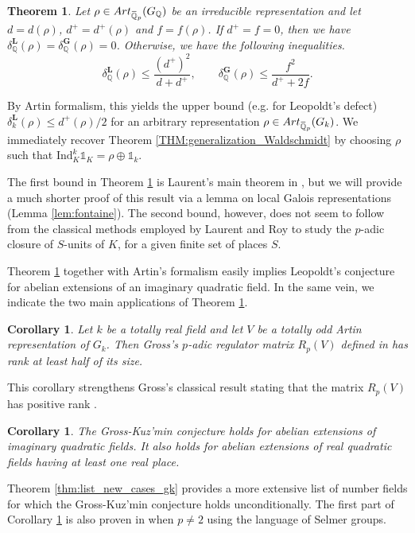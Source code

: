 \documentclass[12pt]{amsart}
\newcommand{\Q}{\mathbb{Q}}
\newcommand{\ob}[1]{\mkern 1.5mu\overline{\mkern-1.5mu#1\mkern-1.5mu}\mkern 1.5mu}
\newcommand{\Ind}{\mathrm{Ind}}
\newcommand{\Art}{\textrm{Art}}
\theoremstyle{defstyle}
\theoremstyle{thmstyle}
\newtheorem{THM}[subsection]{Theorem}
\newtheorem{CORO}[subsection]{Corollary}
\begin{document}
	\begin{THM}\label{THM:main_thm}
		Let $\rho \in \Art_{\ob{\Q}_p}(G_\Q)$ be an irreducible representation and let $d=d(\rho)$, $d^+=d^+(\rho)$ and $f=f(\rho)$. If $d^+=f=0$, then we have $\delta^\textbf{L}_\Q(\rho)=\delta^\textbf{G}_\Q(\rho)=0$. Otherwise, we have the following inequalities.
		\[
		\delta^\textbf{L}_\Q(\rho) \leq \dfrac{(d^+)^2}{d+d^+}, \qquad
		\delta^\textbf{G}_\Q(\rho) \leq \dfrac{f^2}{d^++2f}.	
		\]
	\end{THM}
	By Artin formalism, this yields the upper bound (e.g. for Leopoldt's defect) $\delta^\textbf{L}_k(\rho)\leq d^+(\rho)/2$ for an arbitrary representation $\rho\in \Art_{\ob{\Q}_p}(G_k)$.
	We immediately recover  Theorem \ref{THM:generalization_Waldschmidt} by choosing $\rho$ such that $\Ind^k_K \mathds{1}_K = \rho \oplus \mathds{1}_k$.
	
	The first bound in Theorem \ref{THM:main_thm} is Laurent's main theorem in \cite{laurentcrelle}, but we will provide a much shorter proof of this result via a lemma on local Galois representations (Lemma \ref{lem:fontaine}). The second bound, however, does not seem to follow from the classical methods employed by Laurent \cite{laurentcrelle} and Roy \cite{roy} to study the $p$-adic closure of $S$-units of $K$, for a given finite set of places $S$. 
	
	Theorem \ref{THM:main_thm} together with Artin's formalism easily implies Leopoldt's conjecture for abelian extensions of an imaginary quadratic field. In the same vein, we indicate the two main applications of Theorem \ref{THM:main_thm}. 
	
	\begin{CORO}\label{CORO:gross_reg}
		Let $k$ be a totally real field and let $V$ be a totally odd Artin representation of $G_k$. Then Gross's $p$-adic regulator matrix $R_p(V)$ defined in \cite[(2.10)]{gross1981padic} has rank at least half of its size.
	\end{CORO}
	This corollary strengthens Gross's classical result stating that the matrix $R_p(V)$ has positive rank \cite[Prop. 2.13]{gross1981padic}.
	\begin{CORO}\label{CORO:gk_dihedral}
	The Gross-Kuz'min conjecture holds for abelian extensions of imaginary quadratic fields. It also holds for abelian extensions of real quadratic fields having at least one real place.
	\end{CORO}
	Theorem \ref{thm:list_new_cases_gk} provides a more extensive list of number fields for which the Gross-Kuz'min conjecture holds unconditionally. The first part of Corollary \ref{CORO:gk_dihedral} is also proven in \cite{hIMC} when $p\neq 2$ using the language of Selmer groups.
	
\end{document}
